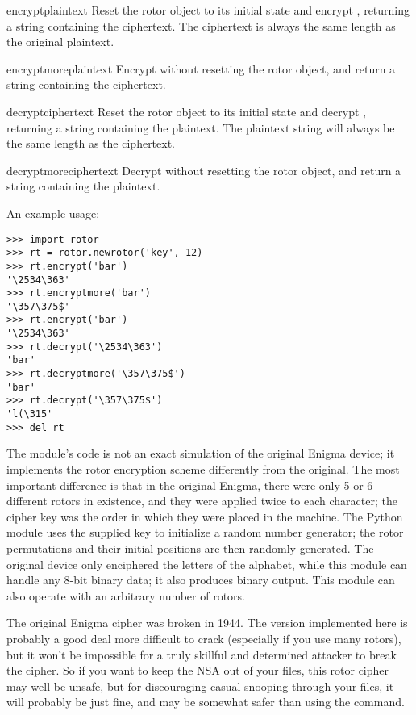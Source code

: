 \begin{methoddesc}[rotor]{encrypt}{plaintext}
Reset the rotor object to its initial state and encrypt ,
returning a string containing the ciphertext.  The ciphertext is always the
same length as the original plaintext.
\end{methoddesc}

\begin{methoddesc}[rotor]{encryptmore}{plaintext}
Encrypt  without resetting the rotor object, and return a
string containing the ciphertext.
\end{methoddesc}

\begin{methoddesc}[rotor]{decrypt}{ciphertext}
Reset the rotor object to its initial state and decrypt ,
returning a string containing the plaintext.  The plaintext string will
always be the same length as the ciphertext.
\end{methoddesc}

\begin{methoddesc}[rotor]{decryptmore}{ciphertext}
Decrypt  without resetting the rotor object, and return a
string containing the plaintext.
\end{methoddesc}

An example usage:
\begin{verbatim}
>>> import rotor
>>> rt = rotor.newrotor('key', 12)
>>> rt.encrypt('bar')
'\2534\363'
>>> rt.encryptmore('bar')
'\357\375$'
>>> rt.encrypt('bar')
'\2534\363'
>>> rt.decrypt('\2534\363')
'bar'
>>> rt.decryptmore('\357\375$')
'bar'
>>> rt.decrypt('\357\375$')
'l(\315'
>>> del rt
\end{verbatim}

The module's code is not an exact simulation of the original Enigma
device; it implements the rotor encryption scheme differently from the
original. The most important difference is that in the original
Enigma, there were only 5 or 6 different rotors in existence, and they
were applied twice to each character; the cipher key was the order in
which they were placed in the machine.  The Python 
module uses the supplied key to initialize a random number generator;
the rotor permutations and their initial positions are then randomly
generated.  The original device only enciphered the letters of the
alphabet, while this module can handle any 8-bit binary data; it also
produces binary output.  This module can also operate with an
arbitrary number of rotors.

The original Enigma cipher was broken in 1944. %
The version implemented here is probably a good deal more difficult to crack
(especially if you use many rotors), but it won't be impossible for
a truly skillful and determined attacker to break the cipher.  So if you want
to keep the NSA out of your files, this rotor cipher may well be unsafe, but
for discouraging casual snooping through your files, it will probably be
just fine, and may be somewhat safer than using the \UNIX{} 
command.
